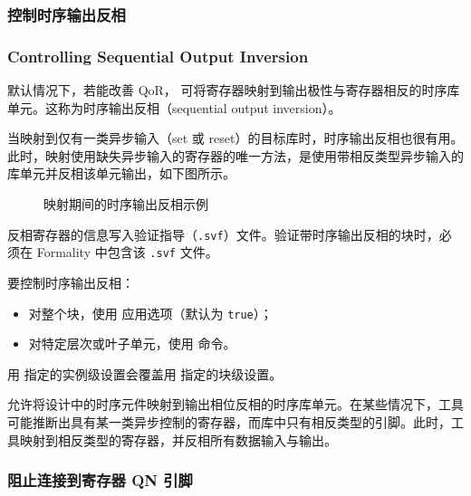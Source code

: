 \subsubsection{控制时序输出反相}
\subsubsection*{Controlling Sequential Output Inversion}

默认情况下，若能改善 QoR， 可将寄存器映射到输出极性与寄存器相反的时序库单元。这称为时序输出反相（sequential output inversion）。

当映射到仅有一类异步输入（set 或 reset）的目标库时，时序输出反相也很有用。此时，映射使用缺失异步输入的寄存器的唯一方法，是使用带相反类型异步输入的库单元并反相该单元输出，如下图所示。

\begin{figure}[htbp]
\centering
{}
\caption{映射期间的时序输出反相示例}
\label{fig:seq-out-inv}
\end{figure}

\begin{noteBox}
反相寄存器的信息写入验证指导（\texttt{.svf}）文件。验证带时序输出反相的块时，必须在 Formality 中包含该 \texttt{.svf} 文件。
\end{noteBox}

要控制时序输出反相：
\begin{itemize}
  \item 对整个块，使用  应用选项（默认为 \texttt{true}）；
  \item 对特定层次或叶子单元，使用  命令。
\end{itemize}

用  指定的实例级设置会覆盖用  指定的块级设置。

 允许将设计中的时序元件映射到输出相位反相的时序库单元。在某些情况下，工具可能推断出具有某一类异步控制的寄存器，而库中只有相反类型的引脚。此时，工具映射到相反类型的寄存器，并反相所有数据输入与输出。

\subsubsection{阻止连接到寄存器 QN 引脚}
